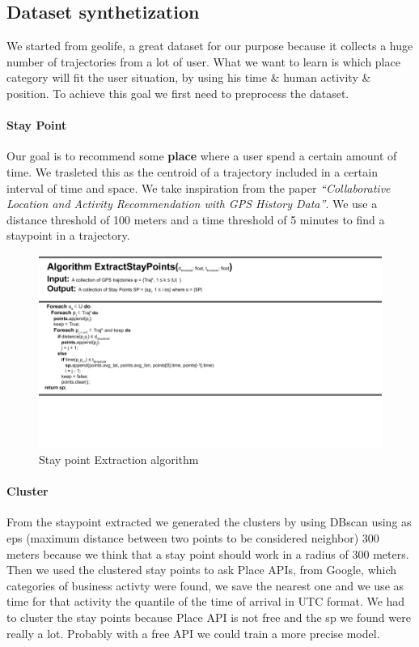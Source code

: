 \documentclass[../../main]{subfiles}
\begin{document}

\subsection{Dataset synthetization}
We started from geolife, a great dataset for our purpose because it collects a huge number of trajectories from a lot of user. What we want to learn is which place category will fit the user situation, by using his time \& human activity \& position.
To achieve this goal we first need to preprocess the dataset.

\paragraph{Stay Point}
Our goal is to recommend some \textbf{place} where a user spend a certain amount of time. We trasleted this as the centroid
of a trajectory included in a certain interval of time and space. We take inspiration from the paper 
\textit{``Collaborative Location and Activity Recommendation with GPS History Data''}. 
We use a distance threshold of 100 meters and a time threshold of 5 minutes to find a staypoint in a trajectory.
\begin{figure}[h]
    \centering
    \includegraphics{images/sp.png}
    \caption{Stay point Extraction algorithm}\label{fig:extraction_sp}
\end{figure}

\paragraph{Cluster}
From the staypoint extracted we generated the clusters by using DBscan using as eps (maximum distance between two points to be considered neighbor) 
300 meters because we think that a stay point should work in a radius of 300 meters. Then we used the clustered stay points to ask Place APIs, from Google, 
which categories of business activty were found, we save the nearest one and we use as time for that activity the quantile of the time of arrival in UTC format.
We had to cluster the stay points because Place API is not free and the sp we found were really a lot. Probably with a free API we could train a more precise model.
\end{document}
